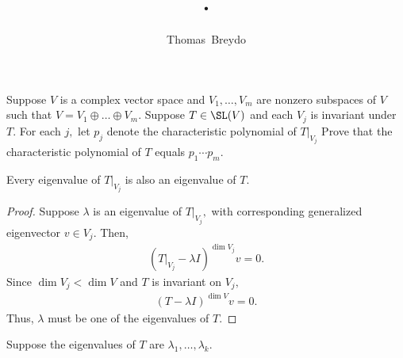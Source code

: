 \documentclass{amsart}
\title{\pagenum.\probnum}
\author{Thomas\ Breydo}
\newcommand{\restrict}[2]{\left.#1\right|_{#2}}
\begin{document}
\maketitle

\begin{problem*}
Suppose $V$ is a complex vector space and $V_1,\dots,V_m$ are
nonzero subspaces of $V$ such that $V=V_1\oplus\dots\oplus V_m.$
Suppose $T\in\SL(V)$ and each $V_j$ is invariant under $T.$
For each $j,$ let $p_j$ denote the characteristic polynomial
of $\restrict{T}{V_j}$ Prove that the characteristic
polynomial of $T$ equals $p_1\cdots p_m.$
\end{problem*}

\vspace{0.5in}

\begin{claim*}
Every eigenvalue of $\restrict{T}{V_j}$ is also an eigenvalue
of $T.$
\end{claim*}
\begin{proof}
Suppose $\lambda$ is an eigenvalue of $\restrict{T}{V_j},$
with corresponding generalized eigenvector $v\in V_j.$
Then,
\begin{align*}
\left(\restrict{T}{V_j}-\lambda I\right)^{\dim V_j}v=0.
\end{align*}
Since $\dim V_j<\dim V$ and $T$ is invariant on $V_j,$
\begin{align*}
\left(T-\lambda I\right)^{\dim V}v=0.
\end{align*}
Thus, $\lambda$ must be one of the eigenvalues of $T$.
\end{proof}

\vspace{\baselineskip}

Suppose the eigenvalues of $T$ are $\lambda_1,\dots,\lambda_k.$
\end{document}
